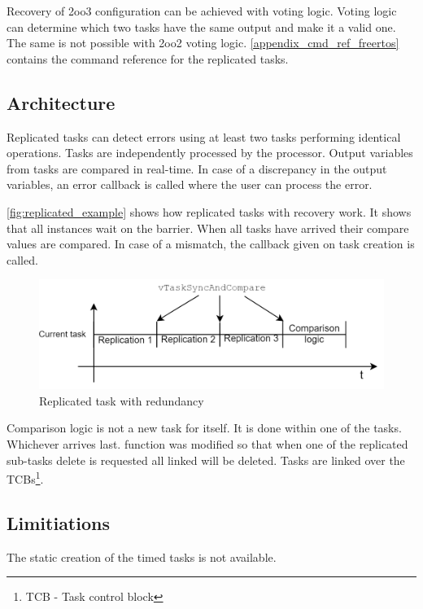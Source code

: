 Recovery of 2oo3 configuration can be achieved with voting logic. Voting logic can determine which two tasks have the same output and make it a valid one. The same is not possible with 2oo2 voting logic. \autoref{appendix_cmd_ref_freertos} contains the command reference for the replicated tasks.

\subsection{Architecture}

Replicated tasks can detect errors using at least two tasks performing identical operations. Tasks are independently processed by the processor. Output variables from tasks are compared in real-time. In case of a discrepancy in the output variables, an error callback is called where the user can process the error.

\autoref{fig:replicated_example} shows how replicated tasks with recovery work. It shows that all instances wait on the barrier. When all tasks have arrived their compare values are compared. In case of a mismatch, the callback given on task creation is called. 


\begin{figure}[H]

      \centering
      \includegraphics[width=\linewidth]{images/replicated_example.png}
      \caption{Replicated task with redundancy}
      \label{fig:replicated_example}
    
\end{figure}

Comparison logic is not a new task for itself. It is done within one of the tasks. Whichever arrives last.  function was modified so that when one of the replicated sub-tasks delete is requested all linked will be deleted. Tasks are linked over the TCBs\footnote{TCB - Task control block}.

\subsection{Limitiations}

The static creation of the timed tasks is not available.

